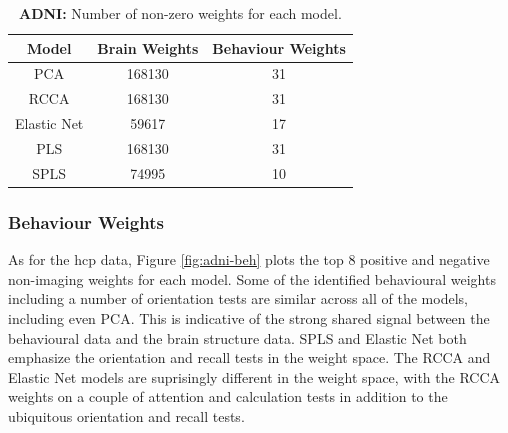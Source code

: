 \begin{table}
    \centering
    \caption{\textbf{ADNI:} Number of non-zero \gls{weights} for each model.}
    \begin{tabular}{|c|c|c|}
        \hline
        Model       & Brain Weights & Behaviour Weights \\
        \hline
        PCA         & 168130        & 31                \\
        RCCA        & 168130        & 31                \\
        Elastic Net & 59617         & 17                \\
        PLS         & 168130        & 31                \\
        SPLS        & 74995         & 10                \\
        \hline
    \end{tabular}\label{tab:brain-behaviour-weights-adni}
\end{table}

\subsubsection{Behaviour Weights}

As for the \acrshort{hcp} data, Figure \ref{fig:adni-beh} plots the top 8 positive and negative non-imaging \gls{weights} for each model.
Some of the identified behavioural \gls{weights} including a number of orientation tests are similar across all of the models, including even PCA.
This is indicative of the strong shared signal between the behavioural data and the brain structure data.
SPLS and Elastic Net both emphasize the orientation and recall tests in the weight space.
The RCCA and Elastic Net models are suprisingly different in the weight space, with the RCCA \gls{weights} on a couple of attention and calculation tests in addition to the ubiquitous orientation and recall tests.

